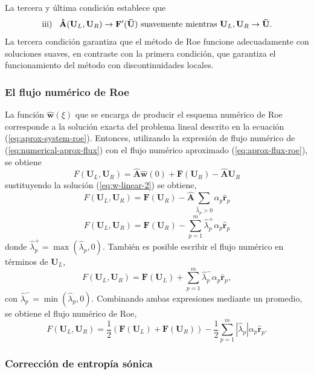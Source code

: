 La tercera y última condición establece que
\begin{equation}
	\text{iii)}\hspace{3mm} \mathbf{\hat{A}}(\mathbf{U}_L, \mathbf{U}_R) \rightarrow \mathbf{F}'(\mathbf{\bar{U}}) \text{ suavemente mientras } \mathbf{{U}}_L, \mathbf{{U}}_R \rightarrow \mathbf{\bar{U}}.
\end{equation}
La tercera condición garantiza que el método de Roe funcione adecuadamente con soluciones suaves, en contraste con la primera condición, que garantiza el funcionamiento del método con discontinuidades locales. 
\subsubsection{El flujo numérico de Roe}
La función $\mathbf{\hat{w}}(\xi)$ que se encarga de producir el esquema numérico de Roe corresponde a la solución exacta del problema lineal descrito en la ecuación (\ref{eq:aprox-system-roe}). Entonces, utilizando la expresión de flujo numérico de (\ref{eq:numerical-aprox-flux}) con el flujo numérico aproximado (\ref{eq:aprox-flux-roe}), se obtiene
\begin{equation}
	F(\mathbf{U}_L, \mathbf{U}_R) = \mathbf{\hat{A}}{\mathbf{\hat{w}}}(0) +  \mathbf{F}(\mathbf{U}_R)-\mathbf{\hat{A}}\mathbf{U}_R
\end{equation}
sustituyendo la solución (\ref{eq:w-linear-2}) se obtiene,
\begin{equation}
	F(\mathbf{U}_L, \mathbf{U}_R) = \mathbf{F}(\mathbf{U}_R) - \mathbf{\hat{A}}\sum_{\hat{\lambda}_p > 0}\alpha_{p} \mathbf{\hat{r}}_{p}
\end{equation}
\begin{equation}
	F(\mathbf{U}_L, \mathbf{U}_R) = \mathbf{F}(\mathbf{U}_R) - \sum_{p=1}^{m} \hat{\lambda}_{p}^{+}\alpha_{p}\mathbf{\hat{r}}_{p}
\end{equation}
donde $\hat{\lambda}_{p}^{+} = \max{(\hat{\lambda}_{p},0)}$. También es posible escribir el flujo numérico en términos de $\mathbf{U}_L$,
\begin{equation}
	F(\mathbf{U}_L, \mathbf{U}_R) = \mathbf{F}(\mathbf{U}_L) + \sum_{p=1}^{m} \hat{\lambda}_{p}^{-}\alpha_{p}\mathbf{\hat{r}}_{p},
\end{equation}
con $\hat{\lambda}_{p}^{-} = \min{(\hat{\lambda}_{p},0)}$. Combinando ambas expresiones mediante un promedio, se obtiene el flujo numérico de Roe,
\begin{equation}
	F(\mathbf{U}_L, \mathbf{U}_R) = \frac{1}{2}\left(\mathbf{F}(\mathbf{U}_L) +\mathbf{F}(\mathbf{U}_R)\right) - 
	\frac{1}{2}\sum_{p=1}^{m}|\hat{\lambda}_{p}|\alpha_{p}\mathbf{\hat{r}}_{p}.
	\label{eq:roe-flux}
\end{equation}
\subsubsection{Corrección de entropía sónica}